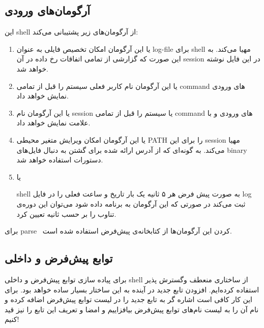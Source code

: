 \documentclass{article}
\begin{document}
\subsection{آرگومان‌های ورودی}
این shell از آرگومان‌های زیر پشتیبانی می‌کند:
\begin{enumerate}
\item {} یا 
این آرگومان امکان تخصیص فایلی به عنوان log-file برای shell مهیا می‌کند. به این صورت که گزارشی از تمامی اتفاقات رخ داده در آن session در این فایل نوشته خواهد شد.

\item {} یا 
این آرگومان نام کاربر فعلی سیستم را قبل از تمامی command های ورودی نمایش خواهد داد.

\item {} یا 
این آرگومان نام session یا سیستم را قبل از تمامی command های ورودی و با علامت \@ نمایش خواهد داد.

\item {} یا 
این آرگومان امکان ویرایش متغیر محیطی PATH را برای این session مهیا می‌کند. به گونه‌ای که از آدرس ارائه شده برای گشتن به دنبال فایل‌های binary دستورات استفاده خواهد شد.

\item {} یا 

shell 
به صورت پیش فرض هر ۵ ثانیه یک بار تاریخ و ساعت فعلی را در فایل log ثبت می‌کند در صورتی که این آرگومان به برنامه داده شود می‌توان این دوره‌ی تناوب را بر حسب ثانیه تعیین کرد.
\end{enumerate}

برای parse  کردن این آرگومان‌ها از کتابخانه‌ی پیش‌فرض 
استفاده شده است.

\subsection{توابع پیش‌فرض و داخلی}
برای پیاده سازی توابع پیش‌فرض و داخلی shell از ساختاری منعطف وگسترش پذیر استفاده کرده‌ایم. افزودن تابع جدید در آینده به این ساختار بسیار ساده  خواهد بود. برای این کار کافی است اشاره گر به تابع جدید را در لیست توابع پیش‌فرض اضافه کرده و نام آن را به لیست نام‌های توابع پیش‌فرض بیافزاییم و امضا و تعریف این تابع را نیز قید کنیم!
\end{document}
